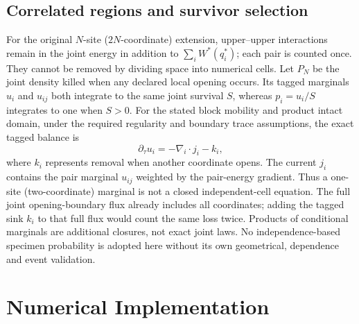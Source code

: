\documentclass[11pt]{article}
\begin{document}
\subsection{Correlated regions and survivor selection}
For the original $N$-site ($2N$-coordinate) extension, upper--upper interactions remain in
the joint energy in addition to $\sum_iW^*(q_i^*)$; each pair is counted once.
They cannot be removed by dividing space into numerical cells.
Let $P_N$ be the joint density killed when any declared local opening occurs.
Its tagged marginals $u_i$ and $u_{ij}$ both integrate to the same joint survival
$S$, whereas $p_i=u_i/S$ integrates to one when $S>0$.
For the stated block mobility and product intact domain, under the required
regularity and boundary trace assumptions, the exact tagged balance is
\begin{equation}
 \partial_\tau u_i=-\nabla_i\!\cdot j_i-k_i,
\end{equation}
where $k_i$ represents removal when another coordinate opens. The current $j_i$
contains the pair marginal $u_{ij}$ weighted by the pair-energy gradient.
Thus a one-site (two-coordinate) marginal is not a closed independent-cell equation.
The full joint opening-boundary flux already includes all coordinates;
adding the tagged sink $k_i$ to that full flux would count the same loss twice.
Products of conditional marginals are additional closures, not exact joint laws.
No independence-based specimen probability is adopted here without its own
geometrical, dependence and event validation.

\section{Numerical Implementation}
\end{document}
